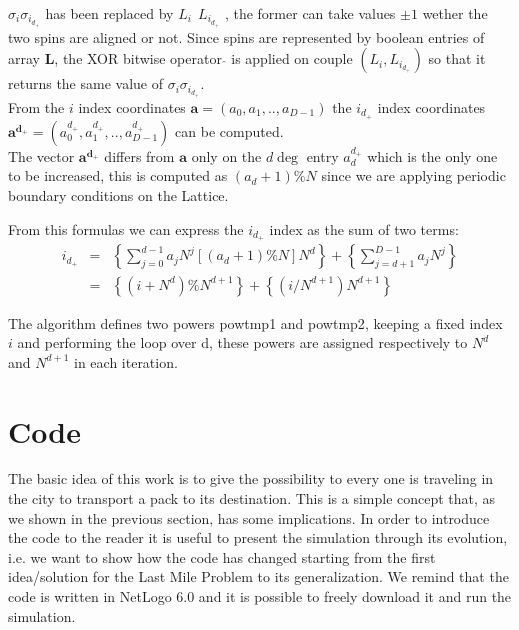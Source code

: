 \documentclass[11pt,a4paper]{article}
\begin{document}
$\sigma_i\sigma_{i_{d_+}}$ has been replaced by $L_i \ \hat{} \ L_{i_{d_+}}$ , the former can take values $\pm1$ wether the two spins are aligned or not. Since spins are represented by boolean entries of array $\mathbf{L}$, the XOR bitwise operator $\hat{}$ is applied on couple $(L_i,L_{i_{d_+}})$ so that it returns the same value of $\sigma_i\sigma_{i_{d_+}}$. \\   
\vspace{0.1cm}
From the $i$ index coordinates $\mathbf{a} = (a_0,a_1,..,a_{D-1})$ the $i_{d_+}$ index coordinates 
$\mathbf{a^{d_+}} = (a^{d_+}_0,a^{d_+}_1,..,a^{d_+}_{D-1})$ can be computed. \\
The vector $\mathbf{a^{d_+}}$ differs from $\mathbf{a}$
only on the $d\deg$ entry $a^{d_+}_d$ which is the only one to be increased, this is computed as $(a_d+1)\%N$ since we are applying periodic boundary conditions on the Lattice. 

From this formulas we can express the $i_{d_+}$ index as the sum of two terms:
\begin{eqnarray*}
i_{d_+} &=& \left\{ \sum_{j = 0}^{d-1}a_jN^j  [(a_d + 1)\%N]N^d \right\} + \left\{ \sum_{j = d+1}^{D-1}a_jN^j \right\}  \\
&=& \left\{(i + N^d)\%N^{d+1} \right\}  +  \left\{ (i/N^{d+1})N^{d+1}  \right\} 
\end{eqnarray*}

The algorithm defines two powers \textsf{pow\textunderscore tmp1} and \textsf{pow\textunderscore tmp2}, keeping a fixed index $i$ and performing the loop over d, these powers are assigned respectively to $N^d$ and $N^{d+1}$ in each iteration. 

\newpage 
\section{Code}
The basic idea of this work is to give the possibility to every one is traveling in the city to transport a pack to its destination. 
This is a simple concept that, as we shown in the previous section, has some implications. In order to introduce the code to the reader it is useful to present the simulation through its evolution, i.e. we want to show how the code has changed starting from the first idea/solution for the Last Mile Problem to its generalization. 
We remind that the code is written in NetLogo 6.0 and it is possible to freely download it and run the simulation.
\end{document}
